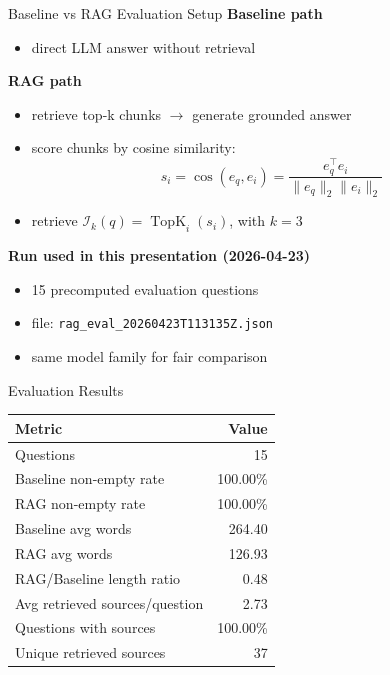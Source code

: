 \documentclass{beamer}
\begin{document}
\begin{frame}{Baseline vs RAG Evaluation Setup}
\small
\textbf{Baseline path}
\begin{itemize}
  \item direct LLM answer without retrieval
\end{itemize}

\textbf{RAG path}
\begin{itemize}
  \item retrieve top-k chunks \(\rightarrow\) generate grounded answer
  \item score chunks by cosine similarity:
  \[
  s_i=\cos(e_q,e_i)=\frac{e_q^\top e_i}{\|e_q\|_2\|e_i\|_2}
  \]
  \item retrieve \(\mathcal{I}_k(q)=\operatorname{TopK}_{i}(s_i)\), with \(k=3\)
\end{itemize}

\textbf{Run used in this presentation (2026-04-23)}
\begin{itemize}
  \item 15 precomputed evaluation questions
  \item file: \texttt{rag\_eval\_20260423T113135Z.json}
  \item same model family for fair comparison
\end{itemize}
\end{frame}

\begin{frame}{Evaluation Results}
\small
\begin{table}
\centering
\begin{tabular}{lr}
\toprule
Metric & Value \\
\midrule
Questions & 15 \\
Baseline non-empty rate & 100.00\% \\
RAG non-empty rate & 100.00\% \\
Baseline avg words & 264.40 \\
RAG avg words & 126.93 \\
RAG/Baseline length ratio & 0.48 \\
Avg retrieved sources/question & 2.73 \\
Questions with sources & 100.00\% \\
Unique retrieved sources & 37 \\
\bottomrule
\end{tabular}
\end{table}
\end{frame}
\end{document}
